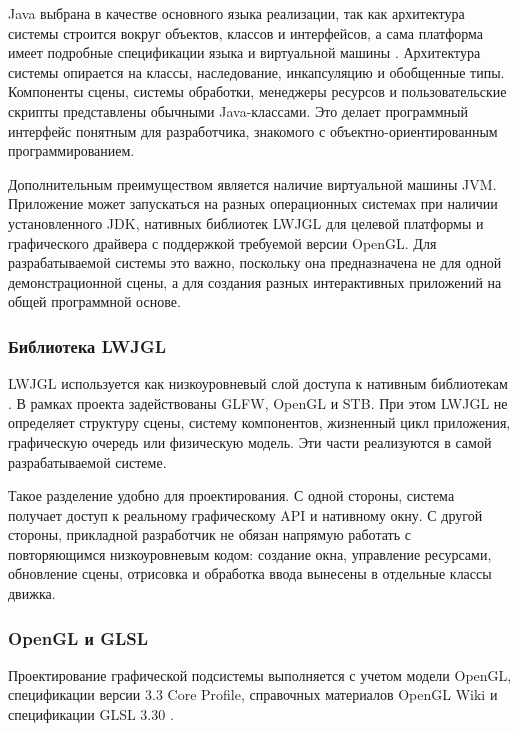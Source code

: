 Java выбрана в качестве основного языка реализации, так как архитектура системы
строится вокруг объектов, классов и интерфейсов, а сама платформа имеет
подробные спецификации языка и виртуальной машины \cite{oracle-java25,java-language-spec,java-vm-spec}.
Архитектура системы опирается на классы, наследование, инкапсуляцию и обобщенные типы. Компоненты
сцены, системы обработки, менеджеры ресурсов и пользовательские скрипты
представлены обычными Java-классами. Это делает программный интерфейс
понятным для разработчика, знакомого с объектно-ориентированным
программированием.

Дополнительным преимуществом является наличие виртуальной машины JVM.
Приложение может запускаться на разных операционных системах при наличии
установленного JDK, нативных библиотек LWJGL для целевой платформы и
графического драйвера с поддержкой требуемой версии OpenGL. Для разрабатываемой
системы это важно, поскольку она предназначена не для одной демонстрационной
сцены, а для создания разных интерактивных приложений на общей программной
основе.

\subsubsection{Библиотека LWJGL}

LWJGL используется как низкоуровневый слой доступа к нативным библиотекам \cite{lwjgl,bejarano-lwjgl,gordon-opengl-java}.
В рамках проекта задействованы GLFW, OpenGL и STB. При этом LWJGL не
определяет структуру сцены, систему компонентов, жизненный цикл приложения,
графическую очередь или физическую модель. Эти части реализуются в самой
разрабатываемой системе.

Такое разделение удобно для проектирования. С одной стороны, система получает
доступ к реальному графическому API и нативному окну. С другой стороны,
прикладной разработчик не обязан напрямую работать с повторяющимся
низкоуровневым кодом: создание окна, управление ресурсами, обновление сцены,
отрисовка и обработка ввода вынесены в отдельные классы движка.

\subsubsection{OpenGL и GLSL}

Проектирование графической подсистемы выполняется с учетом модели OpenGL,
спецификации версии 3.3 Core Profile, справочных материалов OpenGL Wiki и
спецификации GLSL 3.30 \cite{khronos-opengl,opengl-spec-33,opengl-wiki,glsl-330}.

